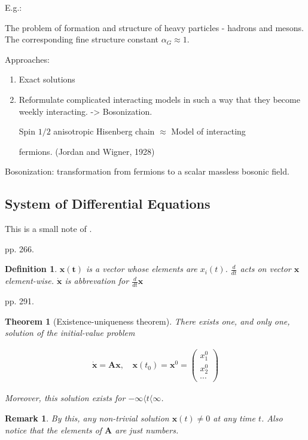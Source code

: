\documentclass{article}
\numberwithin{equation}{subsection} %
\newtheorem{defi}{Definition}[section]
\newtheorem{thm}{Theorem}[section]
\newtheorem{remark}{Remark}[section]
\theoremstyle{definition}
\begin{document}
    E.g.:

    The problem of formation and structure of heavy particles - hadrons and mesons. The corresponding fine structure constant $\alpha_G\approx 1$.

    Approaches:
    \begin{enumerate}
            \item Exact solutions
            \item Reformulate complicated interacting models in such a way
                    that they become weekly interacting. -> Bosonization.
                    
                    Spin $1/2$ anisotropic Hisenberg chain $\approx$
                    Model of interacting

                    fermions.
                    (Jordan and Wigner, 1928)
    \end{enumerate}
    Bosonization: transformation from fermions to a scalar massless bosonic
    field.


    \subsection{System of Differential Equations}
    This is a small note of \cite{DETA}.

    pp. 266.

    \begin{defi}
        $\mathbf{x(t)}$ is a vector whose elements are $x_i(t)$.
        $ \frac{d}{d t}$ acts on vector $\mathbf{x}$ element-wise.
        $\dot{\mathbf{x}}$ is abbrevation for $\frac{d}{d t}\mathbf{x}$
    \end{defi}
    
    pp. 291.

    \begin{thm}[Existence-uniqueness theorem]
        There exists one, and only one, solution of the initial-value
        problem

        \begin{align}
            \dot{\mathbf{x}}=\mathbf{A}\mathbf{x}\text{, }&
                \mathbf{x}(t_0) = \mathbf{x}^0 = 
                \left(
                \begin{array}{c}
		            x^0_1\\
                    x^0_2\\
                    \cdots
                \end{array} 
                    \right)
        \end{align}
        
        Moreover, this solution exists for $-\infty\langle t\langle \infty$.
    \end{thm}
    \begin{remark}
        By this, any non-trivial solution $\mathbf{x}(t)\neq 0$ at any
        time $t$. Also notice that the elements of $\mathbf{A}$ are just
        numbers.
    \end{remark}
    
\end{document}
